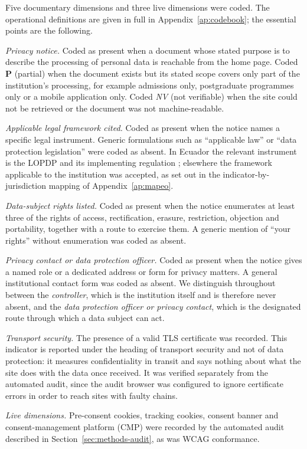 \documentclass[pdflatex,sn-basic,Numbered]{sn-jnl}
\newcommand{\nv}{\textsl{\footnotesize NV}}
\theoremstyle{thmstyleone}
\theoremstyle{thmstyletwo}
\theoremstyle{thmstylethree}
\begin{document}
Five documentary dimensions and three live dimensions were coded. The operational definitions are given in full in Appendix~\ref{ap:codebook}; the essential points are the following.

\emph{Privacy notice.} Coded as present when a document whose stated purpose is to describe the processing of personal data is reachable from the home page. Coded \textbf{P} (partial) when the document exists but its stated scope covers only part of the institution's processing, for example admissions only, postgraduate programmes only or a mobile application only. Coded \nv{} (not verifiable) when the site could not be retrieved or the document was not machine-readable.

\emph{Applicable legal framework cited.} Coded as present when the notice names a specific legal instrument. Generic formulations such as ``applicable law'' or ``data protection legislation'' were coded as absent. In Ecuador the relevant instrument is the LOPDP and its implementing regulation \citep{lopdp2021,reglamentolopdp2023}; elsewhere the framework applicable to the institution was accepted, as set out in the indicator-by-jurisdiction mapping of Appendix~\ref{ap:mapeo}.

\emph{Data-subject rights listed.} Coded as present when the notice enumerates at least three of the rights of access, rectification, erasure, restriction, objection and portability, together with a route to exercise them. A generic mention of ``your rights'' without enumeration was coded as absent.

\emph{Privacy contact or data protection officer.} Coded as present when the notice gives a named role or a dedicated address or form for privacy matters. A general institutional contact form was coded as absent. We distinguish throughout between the \emph{controller}, which is the institution itself and is therefore never absent, and the \emph{data protection officer or privacy contact}, which is the designated route through which a data subject can act.

\emph{Transport security.} The presence of a valid TLS certificate was recorded. This indicator is reported under the heading of transport security and not of data protection: it measures confidentiality in transit and says nothing about what the site does with the data once received. It was verified separately from the automated audit, since the audit browser was configured to ignore certificate errors in order to reach sites with faulty chains.

\emph{Live dimensions.} Pre-consent cookies, tracking cookies, consent banner and consent-management platform (CMP) were recorded by the automated audit described in Section~\ref{sec:methods-audit}, as was WCAG conformance.
\end{document}
